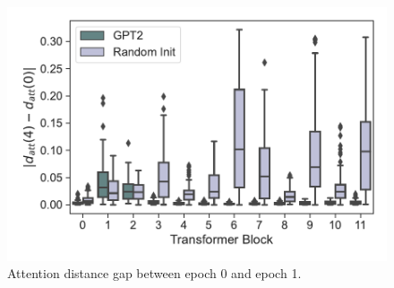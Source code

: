 \documentclass{article}
\begin{document}
\begin{figure}[H]
\begin{minipage}[b]{0.32\linewidth}
        \includegraphics[width=\linewidth]{figs/att_dist_diff_0_1_gpt2_dt_walker2d_medium_666_K1.pdf}
    \end{minipage}
    \caption{Attention distance gap between epoch 0 and epoch 1.}
\end{figure}
\end{document}
